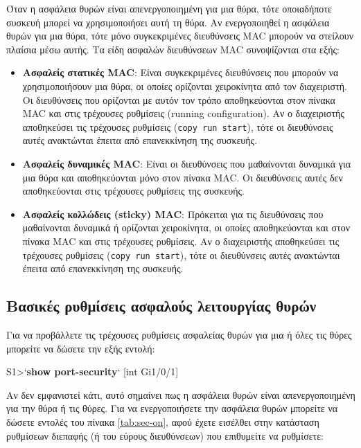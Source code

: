 \documentclass{EdipyLabs} %
\begin{document}
Όταν η ασφάλεια θυρών είναι απενεργοποιημένη για μια θύρα, τότε οποιαδήποτε συσκευή μπορεί να χρησιμοποιήσει αυτή τη θύρα. Αν ενεργοποιηθεί η ασφάλεια θυρών για μια θύρα, τότε μόνο συγκεκριμένες διευθύνσεις MAC μπορούν να στείλουν πλαίσια μέσω αυτής. Τα είδη ασφαλών διευθύνσεων MAC συνοψίζονται στα εξής:
\begin{itemize}
	\item \textbf{Ασφαλείς στατικές MAC}: Είναι συγκεκριμένες διευθύνσεις που μπορούν να χρησιμοποιήσουν μια θύρα, οι οποίες ορίζονται χειροκίνητα από τον διαχειριστή. Οι διευθύνσεις που ορίζονται με αυτόν τον τρόπο αποθηκεύονται στον πίνακα MAC και στις τρέχουσες ρυθμίσεις (running configuration). Αν ο διαχειριστής αποθηκεύσει τις τρέχουσες ρυθμίσεις (\texttt{copy run start}), τότε οι διευθύνσεις αυτές ανακτώνται έπειτα από επανεκκίνηση της συσκευής.
	
	\item \textbf{Ασφαλείς δυναμικές MAC}: Είναι οι διευθύνσεις που μαθαίνονται δυναμικά για μια θύρα και αποθηκεύονται μόνο στον πίνακα MAC. Οι διευθύνσεις αυτές δεν αποθηκεύονται στις τρέχουσες ρυθμίσεις της συσκευής.
	
	\item \textbf{Ασφαλείς κολλώδεις (sticky) MAC}: Πρόκειται για τις διευθύνσεις που μαθαίνονται δυναμικά ή ορίζονται χειροκίνητα, οι οποίες αποθηκεύονται και στον πίνακα MAC και στις τρέχουσες ρυθμίσεις. Αν ο διαχειριστής αποθηκεύσει τις τρέχουσες ρυθμίσεις (\texttt{copy run start}), τότε οι διευθύνσεις αυτές ανακτώνται έπειτα από επανεκκίνηση της συσκευής.
\end{itemize}

\subsection{Βασικές ρυθμίσεις ασφαλούς λειτουργίας θυρών}
Για να προβάλλετε τις τρέχουσες ρυθμίσεις ασφαλείας θυρών για μια ή όλες τις θύρες μπορείτε να δώσετε την εξής εντολή:

\begin{CommandBox}
S1>`\textbf{show port-security}` [int Gi1/0/1]
\end{CommandBox}

Αν δεν εμφανιστεί κάτι, αυτό σημαίνει πως η ασφάλεια θυρών είναι απενεργοποιημένη για την θύρα ή τις θύρες. Για να ενεργοποιήσετε την ασφάλεια θυρών μπορείτε να δώσετε εντολές του πίνακα \ref{tab:sec-on}, αφού έχετε εισέλθει στην κατάσταση ρυθμίσεων διεπαφής (ή του εύρους διευθύνσεων) που επιθυμείτε να ρυθμίσετε:
\end{document}
